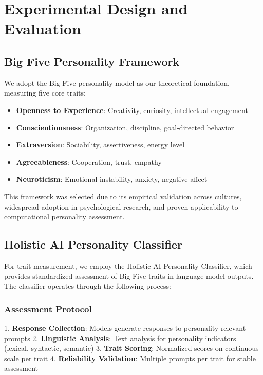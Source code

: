 \section{Experimental Design and Evaluation}
\label{app:experimental-design}

\subsection{Big Five Personality Framework}

We adopt the Big Five personality model as our theoretical foundation, measuring five core traits:

\begin{itemize}
\item \textbf{Openness to Experience}: Creativity, curiosity, intellectual engagement
\item \textbf{Conscientiousness}: Organization, discipline, goal-directed behavior  
\item \textbf{Extraversion}: Sociability, assertiveness, energy level
\item \textbf{Agreeableness}: Cooperation, trust, empathy
\item \textbf{Neuroticism}: Emotional instability, anxiety, negative affect
\end{itemize}

This framework was selected due to its empirical validation across cultures, widespread adoption in psychological research, and proven applicability to computational personality assessment.

\subsection{Holistic AI Personality Classifier}

For trait measurement, we employ the Holistic AI Personality Classifier, which provides standardized assessment of Big Five traits in language model outputs. The classifier operates through the following process:

\subsubsection{Assessment Protocol}
1. \textbf{Response Collection}: Models generate responses to personality-relevant prompts
2. \textbf{Linguistic Analysis}: Text analysis for personality indicators (lexical, syntactic, semantic)
3. \textbf{Trait Scoring}: Normalized scores on continuous scale per trait
4. \textbf{Reliability Validation}: Multiple prompts per trait for stable assessment


